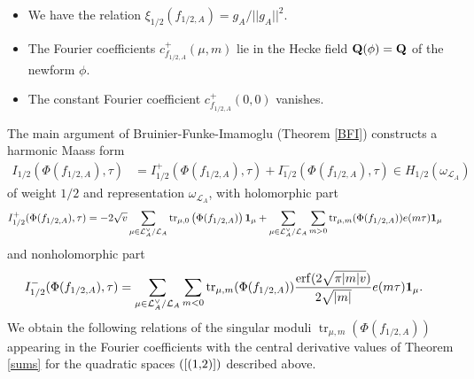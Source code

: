 \documentclass{amsart}
\theoremstyle{definition}
\theoremstyle{definition}
\theoremstyle{definition}
\begin{document}
\begin{itemize}

\item We have the relation $\xi_{1/2} ( f_{1/2, A} ) = g_A / \vert \vert g_A \vert \vert^2$.

\item The Fourier coefficients $c_{ f_{1/2, A} }^+(\mu, m)$ lie in the Hecke field ${\bf{Q}}(\phi) = {\bf{Q}}$ of the newform $\phi$.

\item The constant Fourier coefficient $c_{ f_{1/2, A} }^+(0, 0)$ vanishes. 

\end{itemize}
The main argument of Bruinier-Funke-Imamoglu \cite{BFI} (Theorem \ref{BFI}) constructs a harmonic Maass form 
\begin{align*} I_{1/2}(\Phi(f_{1/2, A}), \tau) &= I^+_{1/2}(\Phi(f_{1/2, A}), \tau) + I^-_{1/2}(\Phi(f_{1/2, A}), \tau) \in H_{1/2}(\omega_{\mathcal{L}_A}) \end{align*}
of weight $1/2$ and representation $\omega_{\mathcal{L}_A}$, with holomorphic part 
\begin{align*} I_{1/2}^+(\Phi(f_{1/2, A}), \tau) 
&= - 2 \sqrt{v} \sum\limits_{\mu \in \mathcal{L}_A^{\vee} / \mathcal{L}_A} 
\operatorname{tr}_{\mu, 0} \left( \Phi(f_{1/2, A}) \right) {\bf{1}}_{\mu}
+ \sum\limits_{\mu \in \mathcal{L}_A^{\vee} / \mathcal{L}_A} \sum\limits_{m >0} \operatorname{tr}_{\mu, m}(\Phi(f_{1/2, A})) e(m \tau) {\bf{1}}_{\mu} \end{align*}
and nonholomorphic part 
\begin{align*} I^-_{1/2}(\Phi(f_{1/2, A}), \tau)
&= \sum\limits_{\mu \in \mathcal{L}_A^{\vee} / \mathcal{L}_A} 
\sum\limits_{m<0}  \operatorname{tr}_{\mu, m}(\Phi(f_{1/2, A}))  \frac{ \operatorname{erf} (2\sqrt{\pi \vert m \vert v})  }{  2 \sqrt{\vert m \vert} }  e(m \tau) {\bf{1}}_{\mu}. \end{align*}
We obtain the following relations of the singular moduli $ \operatorname{tr}_{\mu, m}(\Phi(f_{1/2, A})) $ appearing in the Fourier coefficients with the 
central derivative values of Theorem \ref{sums} for the quadratic spaces $(\ref{(1,2)})$ described above.
\end{document}
